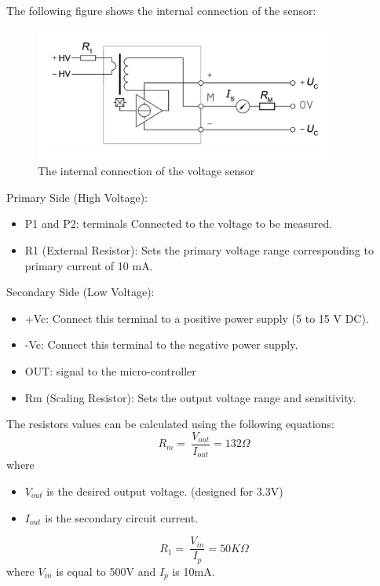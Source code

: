 \documentclass[12pt,a4paper]{book}
\begin{document}
The following figure shows the internal connection of the sensor:
\begin{figure}[h!]
  \centering
  \includegraphics[width = 10cm]{image35.png}
  \caption{The internal connection of the voltage sensor}
  \label{fig:image35}
\end{figure}

Primary Side (High Voltage):
\begin{itemize}
  \item P1 and P2:  terminals Connected to the voltage to be measured.
  \item R1 (External Resistor): Sets the primary voltage range corresponding to primary current of 10 mA.
\end{itemize}

Secondary Side (Low Voltage):
\begin{itemize}
  \item +Vc: Connect this terminal to a positive power supply (5 to 15 V DC).
  \item -Vc: Connect this terminal to the negative power supply.
  \item	OUT: signal to the micro-controller
  \item	Rm (Scaling Resistor): Sets the output voltage range and sensitivity.
\end{itemize}
The resistors values can be calculated using the following equations:
\begin{equation}
  R_{m} = \ \frac{V_{out}}{I_{out}} = 132\Omega
  \label{equation:eq44}
\end{equation}
where
\begin{itemize}
  \item \(V_{out}\) is the desired output voltage. (designed for 3.3V)
  \item \(I_{out}\) is the secondary circuit current.
\end{itemize}
\begin{equation}
  R_{1} = \ \frac{V_{in}}{I_{p}} = 50K\Omega
  \label{equation:eq45}
\end{equation}
where \(V_{in}\) is equal to 500V and \(I_{p}\) is 10mA.
\end{document}
